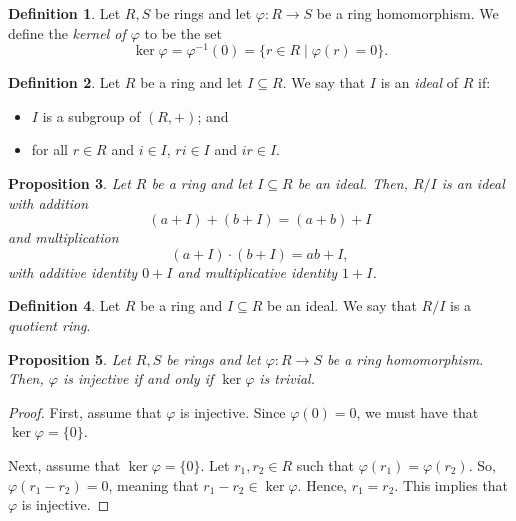 \documentclass[a4paper, openany]{memoir}
\theoremstyle{definition}
\newtheorem{definition}{Definition}[section]
\theoremstyle{plain}
\newtheorem{proposition}[definition]{Proposition}
\begin{document}
    \begin{definition}
        Let $R, S$ be rings and let $\varphi \colon R \to S$ be a ring homomorphism. We define the \emph{kernel of $\varphi$} to be the set
        \[\ker \varphi = \varphi^{-1}(0) = \{r \in R \mid \varphi(r) = 0\}.\]
    \end{definition}

    \begin{definition}
        Let $R$ be a ring and let $I \subseteq R$. We say that $I$ is an \emph{ideal} of $R$ if:
        \begin{itemize}
            \item $I$ is a subgroup of $(R, +)$; and 
            \item for all $r \in R$ and $i \in I$, $ri \in I$ and $ir \in I$.
        \end{itemize}
    \end{definition}

    \begin{proposition}
        Let $R$ be a ring and let $I \subseteq R$ be an ideal. Then, $R/I$ is an ideal with addition
        \[(a + I) + (b + I) = (a + b) + I\]
        and multiplication
        \[(a + I) \cdot (b + I) = ab + I,\]
        with additive identity $0 + I$ and multiplicative identity $1 + I$.
    \end{proposition}

    \begin{definition}
        Let $R$ be a ring and $I \subseteq R$ be an ideal. We say that $R/I$ is a \emph{quotient ring}.
    \end{definition}
    
    \begin{proposition}
        Let $R, S$ be rings and let $\varphi \colon R \to S$ be a ring homomorphism. Then, $\varphi$ is injective if and only if $\ker \varphi$ is trivial.
    \end{proposition}
    \begin{proof}
        First, assume that $\varphi$ is injective. Since $\varphi(0) = 0$, we must have that $\ker \varphi = \{0\}$.

        Next, assume that $\ker \varphi = \{0\}$. Let $r_1, r_2 \in R$ such that $\varphi(r_1) = \varphi(r_2)$. So, $\varphi(r_1 - r_2) = 0$, meaning that $r_1 - r_2 \in \ker \varphi$. Hence, $r_1 = r_2$. This implies that $\varphi$ is injective.
    \end{proof}
\end{document}
